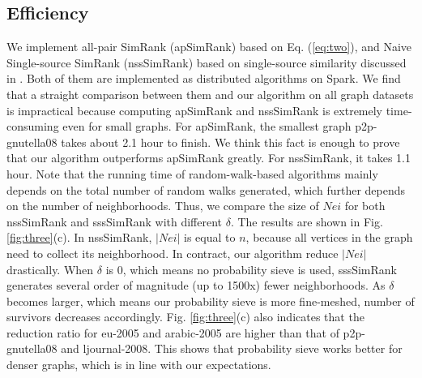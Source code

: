 \documentclass[conference]{IEEEtran}
\theoremstyle{definition}
\theoremstyle{definition}
\begin{document}
\iffalse
\begin{figure}[t]
\centering
  \begin{subfigure}[t]{0.5\textwidth}
\texttt{[image: resource/graph/accuracy1.eps]} 
    \caption{Input graph: p2p-gnutella08}
    \label{fig:1}
  \end{subfigure}
  \begin{subfigure}[t]{0.5\textwidth}
\texttt{[image: resource/graph/accuracy2.eps]} 
    \caption{Input graph: wiki-vote}
    \label{fig:2}
  \end{subfigure}
      \caption{Comparison of accuracy loss and convergence rate between sssSimRank and apSimRank.}
    \label{fig:three}
\end{figure}

\begin{figure}[h]
\centering
\texttt{[image: resource/graph/neighborhoods.eps]} 
    \caption{Comparison of $|Nei|$ between nssSimRank and sssSimRank with varying probability threshold. }
    \label{fig:four}
\end{figure}
\fi
\subsection{Efficiency}
We implement all-pair SimRank (apSimRank) based on Eq. (\ref{eq:two}), and Naive Single-source SimRank (nssSimRank) based on single-source similarity discussed in \cite{li2010fast}. 
Both of them are implemented as distributed algorithms on Spark. 
We find that a straight comparison between them and our algorithm  on all  graph datasets is impractical  because  computing apSimRank and nssSimRank is extremely time-consuming even for small graphs.
For  apSimRank,  the smallest graph p2p-gnutella08 takes about 2.1 hour to finish.
We think this fact is enough to prove that our algorithm outperforms apSimRank greatly.
For nssSimRank, it takes 1.1 hour. 
Note that the running time of  random-walk-based algorithms mainly depends on the total number of random walks generated, which further depends on the number of neighborhoods. 
Thus, we compare the size of $Nei$ for both nssSimRank and sssSimRank with different $\delta$.
The results are shown in Fig. \ref{fig:three}(c).
In nssSimRank, $|Nei|$ is equal to $n$, because all vertices in the graph need to collect its neighborhood.
In contract, our algorithm reduce $|Nei|$ drastically.
When $\delta$ is 0, which means no probability sieve is used, sssSimRank generates several order of  magnitude (up to 1500x) fewer  neighborhoods.
As $\delta$ becomes larger, which means our probability sieve is more fine-meshed,  number of survivors decreases accordingly. 
Fig. \ref{fig:three}(c)  also indicates that the reduction ratio for eu-2005  and arabic-2005 are higher than that of  p2p-gnutella08  and ljournal-2008.
This shows that probability sieve works better for denser graphs, which is in line with our expectations. 
\end{document}
